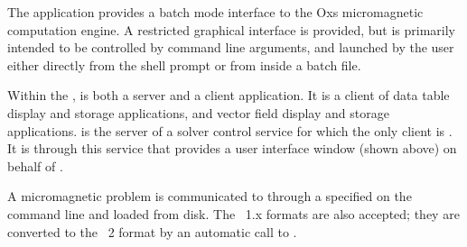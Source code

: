The application  provides a batch mode interface to the Oxs
micromagnetic computation engine.  A restricted graphical interface is
provided, but  is primarily intended to be controlled by
command line arguments, and launched by the user either directly from
the shell prompt or from inside a batch file.

Within the ,  is both a server and a client
application. It is a client of data table display and storage
applications, and vector field display and storage applications.
 is the server of a solver control service for which the only
client is .  It is through
this service that  provides a user interface window (shown
above) on behalf of .

A micromagnetic problem is communicated to  through a
 specified on the command line
and loaded from disk.  The \MIF~1.x formats are also accepted; they are
converted to the \MIF~2 format by an automatic call to
.

